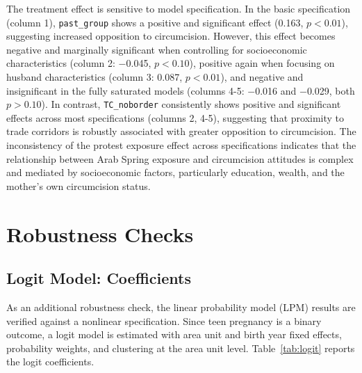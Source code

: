 \documentclass[12pt,a4paper]{article}
\begin{document}
\noindent The treatment effect is sensitive to model specification. In the basic specification (column 1), \texttt{past\_group} shows a positive and significant effect (0.163, $p<0.01$), suggesting increased opposition to circumcision. However, this effect becomes negative and marginally significant when controlling for socioeconomic characteristics (column 2: $-$0.045, $p<0.10$), positive again when focusing on husband characteristics (column 3: 0.087, $p<0.01$), and negative and insignificant in the fully saturated models (columns 4-5: $-$0.016 and $-$0.029, both $p>0.10$). In contrast, \texttt{TC\_noborder} consistently shows positive and significant effects across most specifications (columns 2, 4-5), suggesting that proximity to trade corridors is robustly associated with greater opposition to circumcision. The inconsistency of the protest exposure effect across specifications indicates that the relationship between Arab Spring exposure and circumcision attitudes is complex and mediated by socioeconomic factors, particularly education, wealth, and the mother's own circumcision status.

\vspace{0.25cm}






\section{Robustness Checks}

\subsection{Logit Model: Coefficients}

As an additional robustness check, the linear probability model (LPM) results are verified against a nonlinear specification. Since teen pregnancy is a binary outcome, a logit model is estimated with area unit and birth year fixed effects, probability weights, and clustering at the area unit level. Table~\ref{tab:logit} reports the logit coefficients.
\vspace{0.25cm}
\end{document}
